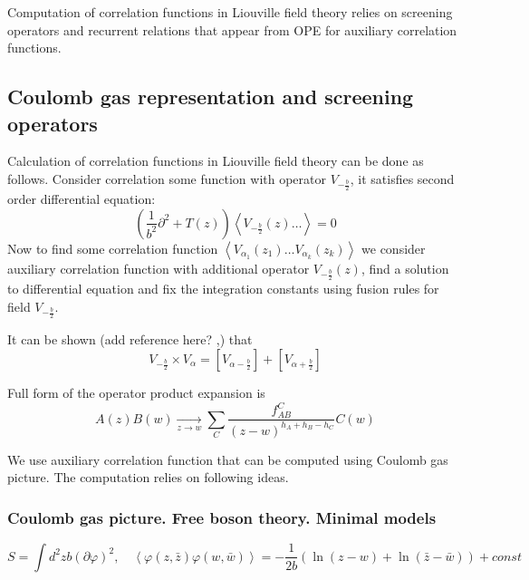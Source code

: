 \documentclass[12pt]{article}
\begin{document}
Computation of correlation functions in Liouville field theory relies on screening operators and
recurrent relations that appear from OPE for auxiliary correlation functions.
\subsection{Coulomb gas representation and screening operators}
\label{sec:coul-gas-repr}

Calculation of correlation functions in Liouville field theory can be done as follows. 
Consider correlation some function with operator $V_{-\frac{b}{2}}$, it satisfies second order
differential equation:
\begin{equation}
  \label{eq:33}
  \left(\frac{1}{b^{2}}\partial^{2}+T(z)\right)\left<V_{-\frac{b}{2}}(z) \dots \right>=0
\end{equation}
Now to find some correlation function $\left<V_{\alpha_{1}}(z_{1})\dots
  V_{\alpha_{k}}(z_{k})\right>$ we consider auxiliary correlation function with additional
operator $V_{-\frac{b}{2}}(z)$, find a solution to differential equation and fix the integration
constants using fusion rules for field $V_{-\frac{b}{2}}$.

It can be shown (add reference here? \cite{nakayama2004liouville},\cite{teschner2001liouville}) that 
\begin{equation}
  \label{eq:34}
  V_{-\frac{b}{2}}\times V_{\alpha}= [V_{\alpha-\frac{b}{2}}]+[V_{\alpha+\frac{b}{2}}]
\end{equation}


Full form of the operator product expansion is
\begin{equation}
  \label{eq:39}
  A(z)B(w)\underset{z\to w}{\longrightarrow} \sum_{C} \frac{f_{AB}^{C}}{(z-w)^{h_{A}+h_{B}-h_{C}}} C(w)
\end{equation}

We use auxiliary correlation function that can be computed using Coulomb gas picture. The
computation relies on following ideas.


\subsubsection{Coulomb gas picture. Free boson theory. Minimal models}
\label{sec:free-boson-minimal-models}


\begin{equation}
  \label{eq:40}
  S=\int d^{2}z b (\partial \varphi)^{2},\quad \left<\varphi(z,\bar z)\varphi(w,\bar
    w)\right>=-\frac{1}{2b}\left(\ln (z-w) + \ln (\bar z - \bar w)\right)+const
\end{equation}
\end{document}
